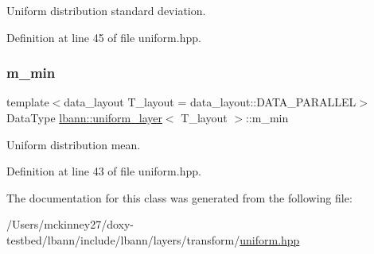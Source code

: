 Uniform distribution standard deviation. 

Definition at line 45 of file uniform.\+hpp.

\mbox{\label{classlbann_1_1uniform__layer_ad2da58c380cf2803da709dd936c19aa1}} 
\subsubsection{\texorpdfstring{m\+\_\+min}{m\_min}}
{\footnotesize\ttfamily template$<$data\+\_\+layout T\+\_\+layout = data\+\_\+layout\+::\+D\+A\+T\+A\+\_\+\+P\+A\+R\+A\+L\+L\+EL$>$ \\
Data\+Type \hyperlink{classlbann_1_1uniform__layer}{lbann\+::uniform\+\_\+layer}$<$ T\+\_\+layout $>$\+::m\+\_\+min\hspace{0.3cm}{\ttfamily [private]}}

Uniform distribution mean. 

Definition at line 43 of file uniform.\+hpp.



The documentation for this class was generated from the following file\+:\begin{DoxyCompactItemize}
\item 
/\+Users/mckinney27/doxy-\/testbed/lbann/include/lbann/layers/transform/\hyperlink{uniform_8hpp}{uniform.\+hpp}\end{DoxyCompactItemize}
